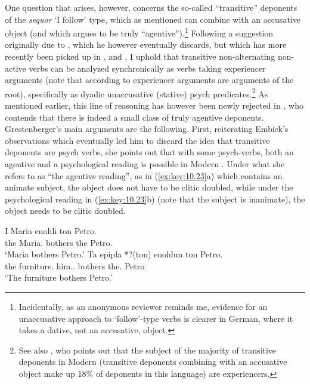 \documentclass[output=paper]{langsci/langscibook}
\begin{document}
One question that arises, however, concerns the so-called “transitive”
\citep{Embick1997} deponents of the \emph{sequor} ‘I follow’ type, which as
mentioned can combine with an accusative object (and which
\citeauthor{Grestenberger2014} argues to be truly
“agentive”).\footnote{Incidentally, as an anonymous reviewer reminds me,
evidence for an unaccusative approach to ‘follow’-type verbs is clearer in
German, where it takes a dative, not an accusative, object.} Following a
suggestion originally due to \citet{Embick1997}, which he however eventually
discards, but which has more recently been picked up in \citet{Alexiadou2013},
\citet{Kallulli2013} and \citet{ZomAle2014}, I uphold that transitive
non-alternating non-active verbs can be analyzed synchronically as verbs taking
experiencer arguments (note that according to \citet{Pesetsky1995} experiencer
arguments are arguments of the root), specifically as dyadic unaccusative
(stative) psych predicates.\footnote{See also \citet{Zombolou2012}, who points
    out that the subject of the majority of transitive deponents in Modern
     (transitive deponents combining with an accusative object make up
18\% of deponents in this language) are experiencers.} As mentioned earlier,
this line of reasoning has however been newly rejected in
\textcite{Grestenberger2014,Grestenberger2018a}, who contends that there is
indeed a small class of truly agentive deponents. Grestenberger’s main
arguments are the following. First, reiterating Embick’s observations which
eventually led him to discard the idea that transitive deponents are psych
verbs, she points out that with some psych-verbs, both an agentive and a
psychological reading is possible in Modern . Under what she refers to as
“the agentive reading”, as in (\ref{ex:key:10.23}a) which contains an
animate
subject, the object does not have to be clitic doubled, while under the
psychological reading in (\ref{ex:key:10.23}b) (note that the subject is
inanimate), the object needs to be clitic doubled.

\ea\label{ex:key:10.23} 
    \ea
	\gll    I    Maria    enohli  ton  Petro.\\
            the  Maria.\Nom{}  bothers  the Petro.\Acc{}\\
    \glt    ‘Maria bothers Petro.’
    \ex
	\gll    Ta    epipla    *?(ton)    enohlun  ton  Petro.\\
            the  furniture.\Nom{} \hphantom{*?(}him.\Cl.\Acc{}  bothers the.\Acc{}  Petro\\
    \glt    ‘The furniture bothers Petro.’
    \z
\z
\end{document}
